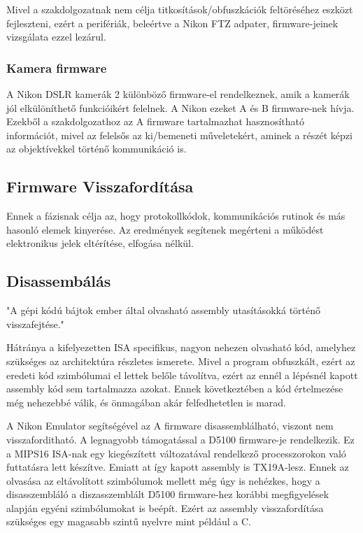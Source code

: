 Mivel a szakdolgozatnak nem célja titkosítások/obfuszkációk feltöréséhez eszközt fejleszteni, ezért a perifériák, beleértve a Nikon FTZ adpater, firmware-jeinek vizsgálata ezzel lezárul.
\subsubsection{Kamera firmware}
A Nikon DSLR kamerák 2 különböző firmware-el rendelkeznek, amik a kamerák jól elkülöníthető funkcióikért felelnek.
A Nikon ezeket A és B firmware-nek hívja\cite{nikon_support_firmware_list}.
Ezekből a szakdolgozathoz az A firmware tartalmazhat hasznosítható információt,
mivel az felelsős az ki/bemeneti műveletekért, aminek a részét képzi az objektívekkel történő kommunikáció is\cite{nikonhackers_understanding_firmware}.

\subsection{Firmware Visszafordítása}
Ennek a fázisnak célja az, hogy protokollkódok, kommunikációs rutinok és más hasonló elemek kinyerése.
Az eredmények segítenek megérteni a működést elektronikus jelek eltérítése, elfogása nélkül.
\subsection{Disassembálás}
"A gépi kódú bájtok ember által olvasható assembly utasításokká történő visszafejtése."\cite{zhang2024disassembling}

Hátránya a kifelyezetten ISA specifikus, nagyon nehezen olvasható kód, amelyhez szükséges az architektúra részletes ismerete.
Mivel a program obfuszkált, ezért az eredeti kód szimbólumai el lettek belőle távolítva, ezért az ennél a lépésnél kapott assembly kód sem tartalmazza azokat.
Ennek következtében a kód értelmezése még nehezebbé válik, és önmagában akár felfedhetetlen is marad.

A Nikon Emulator segítségével az A firmware disassemblálható, viszont nem visszaforditható.
A legnagyobb támogatással a D5100 firmware-je rendelkezik. Ez a MIPS16 ISA-nak egy kiegészített változatával rendelkező processzorokon való futtatásra lett készítve.\cite{nikonhackers_understanding_firmware}
Emiatt at így kapott assembly is TX19A-lesz.
Ennek az olvasása az eltávolított szimbólumok mellett még úgy is nehézkes, hogy a disasszembláló a diszasszemblált D5100 firmware-hez korábbi megfigyelések alapján egyéni szimbólumokat is beépít.
Ezért az assembly visszafordítása szükséges egy magasabb szintű nyelvre mint például a C.


